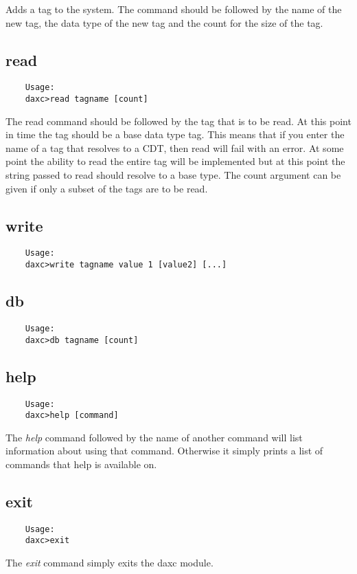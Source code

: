 	Adds a tag to the system.  The command should be followed by the name of the new
	tag, the data type of the new tag and the count for the size of the tag.

	\subsection{read}
	\begin{verbatim}
	Usage:
	daxc>read tagname [count]
	\end{verbatim}

	The read command should be followed by the tag that is to be read.  At this
	point in time the tag should be a base data type tag.  This means that if you
	enter the name of a tag that resolves to a CDT, then read will fail with an
	error.  At some point the ability to read the entire tag will be implemented but
	at this point the string passed to read should resolve to a base type.  The
	count argument can be given if only a subset of the tags are to be read.

	\subsection{write}
	\begin{verbatim}
	Usage:
	daxc>write tagname value 1 [value2] [...]
	\end{verbatim}

	\subsection{db}
	\begin{verbatim}
	Usage:
	daxc>db tagname [count]
	\end{verbatim}

	\subsection{help}
	\begin{verbatim}
	Usage:
	daxc>help [command]
	\end{verbatim}

	The \textit{help} command followed by the name of another command will list
	information about using that command. Otherwise it simply prints a list of
	commands that help is available on.

	\subsection{exit}
	\begin{verbatim}
	Usage:
	daxc>exit
	\end{verbatim}
	The \textit{exit} command simply exits the daxc module.

